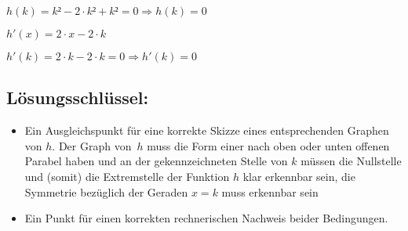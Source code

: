 \begin{langesbeispiel}
{\begin{enumerate}
$h(k)=k²-2\cdot k²+k²=0 \Rightarrow h(k)=0$

$h'(x)=2\cdot x-2\cdot k$

$h'(k)=2\cdot k-2\cdot k=0 \Rightarrow h'(k)=0$
	
	\subsection{Lösungsschlüssel:}
	
\begin{itemize}
	\item Ein Ausgleichspunkt für eine korrekte Skizze eines entsprechenden Graphen von $h$. Der Graph von $h$ muss die Form einer nach oben oder unten offenen Parabel haben und an der gekennzeichneten Stelle von $k$ müssen die Nullstelle und (somit) die Extremstelle der Funktion $h$ klar erkennbar sein, die Symmetrie bezüglich der Geraden  $x=k$  muss erkennbar sein
	\item Ein Punkt für einen korrekten rechnerischen Nachweis beider Bedingungen.
\end{itemize}

\end{enumerate}}
		\end{langesbeispiel}